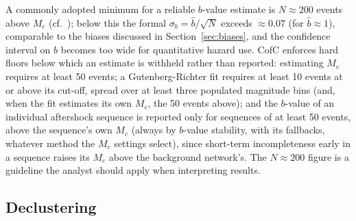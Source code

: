 \documentclass[12pt]{article}
\begin{document}
A commonly adopted minimum for a reliable $b$-value estimate is $N \approx 200$
events above $M_c$ (cf.\ \citealt{marzocchi2003}); below this the formal
$\sigma_b = \hat{b}/\sqrt{N}$ exceeds $\approx 0.07$ (for $\hat{b} \approx 1$),
comparable to the biases
discussed in Section~\ref{sec:biases}, and the confidence interval on $b$ becomes
too wide for quantitative hazard use.  CofC enforces hard floors below which an
estimate is withheld rather than reported: estimating $M_c$ requires at least 50
events; a Gutenberg-Richter fit requires at least 10 events at or above its
cut-off, spread over at least three populated magnitude bins (and, when the fit
estimates its own $M_c$, the 50 events above); and the $b$-value of an individual
aftershock sequence is reported only for sequences of at least 50 events, above
the sequence's own $M_c$ (always by $b$-value stability, with its fallbacks,
whatever method the $M_c$ settings select), since
short-term incompleteness early in a sequence
raises its $M_c$ above the background network's.  The $N \approx 200$ figure is a
guideline the analyst should apply when interpreting results.

\subsection{Declustering}
\label{sec:decluster}
\end{document}
